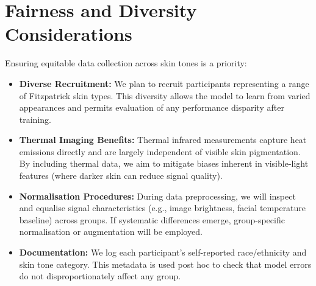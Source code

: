 \documentclass{article}
\begin{document}
\section{Fairness and Diversity Considerations}
Ensuring equitable data collection across skin tones is a priority:
\begin{itemize}
    \item \textbf{Diverse Recruitment:} We plan to recruit participants representing a range of Fitzpatrick skin types. This diversity allows the model to learn from varied appearances and permits evaluation of any performance disparity after training.
    \item \textbf{Thermal Imaging Benefits:} Thermal infrared measurements capture heat emissions directly and are largely independent of visible skin pigmentation. By including thermal data, we aim to mitigate biases inherent in visible-light features (where darker skin can reduce signal quality).
    \item \textbf{Normalisation Procedures:} During data preprocessing, we will inspect and equalise signal characteristics (e.g., image brightness, facial temperature baseline) across groups. If systematic differences emerge, group-specific normalisation or augmentation will be employed.
    \item \textbf{Documentation:} We log each participant’s self-reported race/ethnicity and skin tone category. This metadata is used post hoc to check that model errors do not disproportionately affect any group.
\end{itemize}
\end{document}
